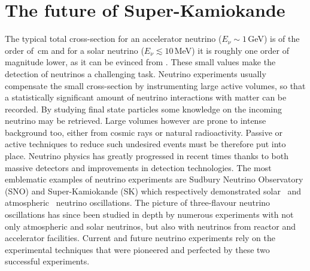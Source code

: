 \chapter{The future of Super-Kamiokande}
\label{cha:skgd}

The typical total cross-section for an accelerator neutrino ($E_\nu \sim1$\,GeV) %
is of the order of \,cm and for a solar neutrino ($E_\nu \lesssim10$\,MeV) %
it is roughly one order of magnitude lower, as it can be evinced from .
These small values make the detection of neutrinos a challenging task.
Neutrino experiments usually compensate the small cross-section by instrumenting large active volumes, %
so that a statistically significant amount of neutrino interactions with matter can be recorded.
By studying final state particles some knowledge on the incoming neutrino may be retrieved.
Large volumes however are prone to intense background too, either from cosmic rays or natural radioactivity.
Passive or active techniques to reduce such undesired events must be therefore put into place.
Neutrino physics has greatly progressed in recent times thanks to both massive detectors and %
improvements in detection technologies.
The most emblematic examples of neutrino experiments are Sudbury Neutrino Observatory (SNO) and Super-Kamiokande (SK) %
which respectively demonstrated solar~\cite{Aharmim:2005gt} and atmospheric~\cite{Fukuda:1998mi} neutrino oscillations.
The picture of three-flavour neutrino oscillations has since been studied in depth %
by numerous experiments with not only atmospheric and solar neutrinos, but also with neutrinos %
from reactor and accelerator facilities.
Current and future neutrino experiments rely on the experimental techniques that were pioneered and perfected %
by these two successful experiments.

